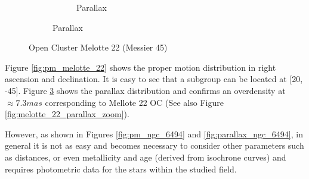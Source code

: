 \documentclass[11pt, a4paper, english]{book}
\begin{document}
\begin{figure}[htbp]
\begin{subfigure}{0.9\textwidth}
\begin{subfigure}[t]{0.45\textwidth}
      \caption{Parallax}
      \label{fig:pm_vec_melotte_22}
    \end{subfigure}
  \end{subfigure}
  \caption{Open Cluster Melotte 22 (Messier 45)}
\end{figure}

Figure \ref{fig:pm_melotte_22} shows the proper motion distribution in right ascension and declination.
It is easy to see that a subgroup can be located at [20, -45].
Figure \ref{fig:pm_vec_melotte_22} shows the parallax distribution and confirms an overdensity at
$\approx 7.3 mas$ corresponding to Mellote 22 OC (See also Figure \ref{fig:melotte_22_parallax_zoom}).

However, as shown in Figures \ref{fig:pm_ngc_6494} and \ref{fig:parallax_ngc_6494}, in general it is not as easy and
becomes necessary to consider other parameters such as distances, or even metallicity and age (derived from isochrone curves)
and requires photometric data for the stars within the studied field.
\end{document}
